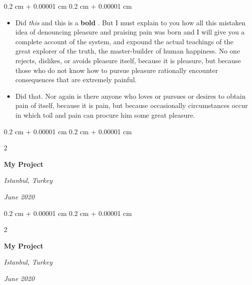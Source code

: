 \documentclass[10pt, letterpaper]{article}
\newenvironment{highlights}{
    \begin{itemize}[
        topsep=0.10 cm,
        parsep=0.10 cm,
        partopsep=0pt,
        itemsep=0pt,
        leftmargin=0.4 cm + 10pt
    ]
}{
    \end{itemize}
} %
\newenvironment{onecolentry}{
    \begin{adjustwidth}{
        0.2 cm + 0.00001 cm
    }{
        0.2 cm + 0.00001 cm
    }
}{
    \end{adjustwidth}
} %
\newenvironment{twocolentry}[2][]{
    \onecolentry
    \def\secondColumn{#2}
    \setcolumnwidth{\fill, 4.5 cm}
    \begin{paracol}{2}
}{
    \switchcolumn \raggedleft \secondColumn
    \end{paracol}
    \endonecolentry
} %
\let\hrefWithoutArrow\href
\renewcommand{\href}[2]{\hrefWithoutArrow{#1}{\ifthenelse{\equal{#2}{}}{ }{#2 }\raisebox{.15ex}{\footnotesize \faExternalLink*}}}
\begin{document}
        \vspace{0.10 cm}
        \begin{onecolentry}
            \begin{highlights}
                \item Did \textit{this} and this is a \textbf{bold} \href{https://example.com}{link}. But I must explain to you how all this mistaken idea of denouncing pleasure and praising pain was born and I will give you a complete account of the system, and expound the actual teachings of the great explorer of the truth, the master-builder of human happiness. No one rejects, dislikes, or avoids pleasure itself, because it is pleasure, but because those who do not know how to pursue pleasure rationally encounter consequences that are extremely painful.
                \item Did that. Nor again is there anyone who loves or pursues or desires to obtain pain of itself, because it is pain, but because occasionally circumstances occur in which toil and pain can procure him some great pleasure.
            \end{highlights}
        \end{onecolentry}


        \vspace{0.2 cm}

        \begin{twocolentry}{
        \textit{Istanbul, Turkey}    
            
        \textit{June 2020}}
            \textbf{My Project}
        \end{twocolentry}



        \vspace{0.2 cm}

        \begin{twocolentry}{
        \textit{Istanbul, Turkey}    
            
        \textit{June 2020}}
            \textbf{My Project}
        \end{twocolentry}
\end{document}
